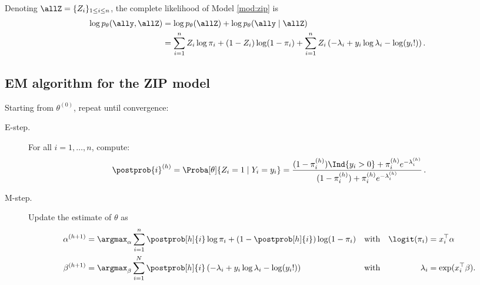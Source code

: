 Denoting $\allZ = \{Z_i\}_{1 \leq i \leq n}$, the complete likelihood of Model \eqref{mod:zip} is
\begin{align} \label{eq:ZIPzipComplete}
  \log p_\theta(\ally, \allZ)
  & = \log p_\theta(\allZ) + \log p_\theta(\ally \mid \allZ) \nonumber \\
  & = \sum_{i=1}^n Z_i \log \pi_i + (1 - Z_i) \log(1- \pi_i) 
  + \sum_{i=1}^n Z_i \left(-\lambda_i + y_i \log \lambda_i - \log(y_i!)\right).
  \end{align}


\subsection{EM algorithm for the ZIP model}



\begin{algorithm}\label{algo:ZIP} 
	Starting from  $\theta^{(0)}$, repeat until convergence:
	\begin{description}
		\item[E-step.]  For all $i=1, \dots,n$,  compute:
		\begin{equation} \label{eq:ZIPtau}
			\postprob{i}^{(h)}  = \Proba[\theta]{Z_i = 1 \mid Y_i =y_i}
			=  \frac{(1 - \pi^{(h)}_i)\Ind{y_i > 0} + \pi^{(h)}_i e^{-\lambda^{(h)}_i}}{(1-\pi^{(h)}_i) + \pi^{(h)}_i e^{-\lambda^{(h)}_i}} \,.
		\end{equation}
		\item[M-step.] 	Update the estimate of $\theta$ as
		\begin{align}\label{eq:updateZIP}
      \alpha^{(h+1)} 
      & = \argmax_\alpha   \sum_{i=1}^n \postprob[h]{i} \log \pi_i + (1 - \postprob[h]{i}) \log(1- \pi_i)  & 
      & \mbox{with} & \logit(\pi_i) & = x_i^\top \alpha \\
      \beta^{(h+1)} 
      & = \argmax_\beta \sum_{i=1}^N \postprob[h]{i} \left(-\lambda_i + y_i \log \lambda_i - \log(y_i!)\right)  &
      & \mbox{with} & \lambda_i & = \exp(x_i^\top \beta). \nonumber
    \end{align}
\end{description}
	
\end{algorithm}
